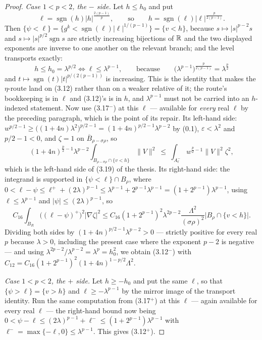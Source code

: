 \begin{proof}
\emph{Case $1<p<2$, the $-$ side.}  Let $h\le h_0$ and put
\[
\ell=\operatorname{sgn}(h)|h|^{\frac{2(p-1)}p},
\qquad\text{so}\qquad
h=\operatorname{sgn}(\ell)|\ell|^{\frac p{2(p-1)}} .
\]
Then $\{\psi<\ell\}=\{g^k<\operatorname{sgn}(\ell)|\ell|^{1/(p-1)}\}=\{v<h\}$,
because $s\mapsto|s|^{p-2}s$ and $s\mapsto|s|^{p/2}\operatorname{sgn}s$ are
strictly increasing bijections of $\mathbb{R}$ and the two displayed exponents are
inverse to one another on the relevant branch; and the level transports exactly:
\[
h\le h_0=\lambda^{p/2}
\iff
\ell\le\lambda^{p-1},
\qquad\text{because}\qquad
\bigl(\lambda^{p-1}\bigr)^{\frac p{2(p-1)}}=\lambda^{\frac p2}
\]
and $t\mapsto\operatorname{sgn}(t)|t|^{p/(2(p-1))}$ is increasing.  This is the
identity that makes the $\eta$-route land on (3.12) rather than on a weaker
relative of it; the route's bookkeeping is in $\ell$ and (3.12)'s is in $h$, and
$\lambda^{p-1}$ must not be carried into an $h$-indexed statement.
Now use (3.17$^-$) at this $\ell$ --- available for \emph{every} real $\ell$ by
the preceding paragraph, which is the point of its repair.  Its left-hand side:
$w^{p/2-1}\ge\bigl((1+4n)\lambda^2\bigr)^{p/2-1}=(1+4n)^{p/2-1}\lambda^{p-2}$ by
(0.1), $\varepsilon<\lambda^2$ and $p/2-1<0$, and $\zeta=1$ on
$\overline B_{\rho-\sigma\rho}$, so
\[
(1+4n)^{\frac p2-1}\lambda^{p-2}\int_{B_{\rho-\sigma\rho}\cap\{v<h\}}\|V\|^2
\ \le\ \int_{A^-_\ell}w^{\frac p2-1}\|V\|^2\zeta^2 ,
\]
which is the left-hand side of (3.19) of the thesis.  Its right-hand side: the
integrand is supported in $\{\psi<\ell\}\cap B_\rho$, where
$0<\ell-\psi\le\ell^++(2\lambda)^{p-1}\le\lambda^{p-1}+2^{p-1}\lambda^{p-1}
=(1+2^{p-1})\lambda^{p-1}$, using $\ell\le\lambda^{p-1}$ and
$|\psi|\le(2\lambda)^{p-1}$, so
\[
C_{16}\int_{B_R}\bigl((\ell-\psi)^+\bigr)^2|\nabla\zeta|^2
\le C_{16}(1+2^{p-1})^2\lambda^{2p-2}\frac{\Lambda^2}{(\sigma\rho)^2}
\bigl|B_\rho\cap\{v<h\}\bigr| .
\]
Dividing both sides by $(1+4n)^{p/2-1}\lambda^{p-2}>0$ --- strictly positive for
every real $p$ because $\lambda>0$, including the present case where the
exponent $p-2$ is negative --- and using
$\lambda^{2p-2}/\lambda^{p-2}=\lambda^{p}=h_0^2$, we obtain (3.12$^-$) with
$C_{12}=C_{16}(1+2^{p-1})^2(1+4n)^{1-p/2}\Lambda^2$.

\emph{Case $1<p<2$, the $+$ side.}  Let $h\ge-h_0$ and put the same $\ell$, so
that $\{\psi>\ell\}=\{v>h\}$ and $\ell\ge-\lambda^{p-1}$ by the mirror image of
the transport identity.  Run the same computation from (3.17$^+$) at this
$\ell$ --- again available for every real $\ell$ --- the right-hand bound now
being $0<\psi-\ell\le(2\lambda)^{p-1}+\ell^-\le(1+2^{p-1})\lambda^{p-1}$ with
$\ell^-=\max\{-\ell,0\}\le\lambda^{p-1}$.  This gives (3.12$^+$).


\end{proof}
